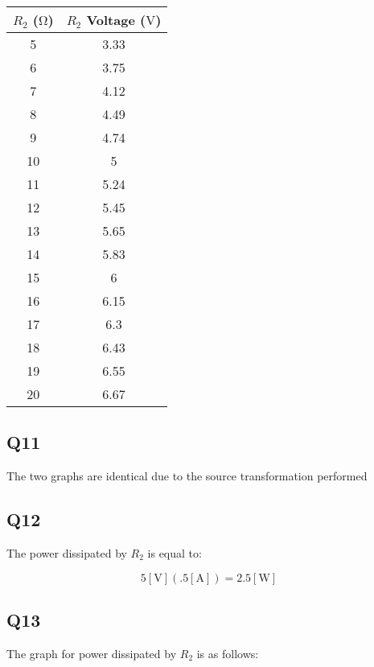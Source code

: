 \documentclass[
	letterpaper, %
	10pt, %
]{CSUniSchoolLabReport}
\begin{document}
    \begin{center}
      \begin{tabular}[h!]{| c | c |}
        \hline
        $R_2$ ($\si{\ohm}$) & $R_2$ Voltage ($\si{\volt}$)\\
        \hline
        5 & 3.33\\
        \hline
        6 & 3.75\\
        \hline
        7 & 4.12\\
        \hline
        8 & 4.49\\
        \hline
        9 & 4.74\\
        \hline
        10 & 5\\
        \hline
        11 & 5.24\\
        \hline
        12 & 5.45\\
        \hline
        13 & 5.65\\
        \hline
        14 & 5.83\\
        \hline
        15 & 6\\
        \hline
        16 & 6.15\\
        \hline
        17 & 6.3\\
        \hline
        18 & 6.43\\
        \hline
        19 & 6.55\\
        \hline
        20 & 6.67\\
        \hline
      \end{tabular}
    \end{center}

    \subsection{Q11} The two graphs are identical due to the source transformation performed

    \subsection{Q12} The power dissipated by $R_2$ is equal to:

    $$5[\si{\volt}](.5[\si{\ampere}])=2.5[\si{\watt}]$$

    \subsection{Q13} The graph for power dissipated by $R_2$ is as follows:

 \begin{center}
    \end{center}
\end{document}
